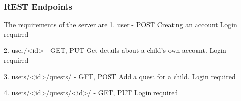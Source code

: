 \subsubsection{REST Endpoints}
The requirements of the server are 	 	
1. user - POST
Creating an account
Login required

2. user/<id> - GET, PUT
Get details about a child's own account.
Login required

3. users/<id>/quests/ - GET, POST
Add a quest for a child.
Login required

4. users/<id>/quests/<id>/ - GET, PUT
Login required